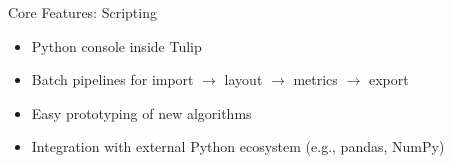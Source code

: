 \begin{frame}{Core Features: Scripting}
	\begin{itemize}
		\item Python console inside Tulip
		\item Batch pipelines for import $\rightarrow$ layout $\rightarrow$ metrics $\rightarrow$ export
		\item Easy prototyping of new algorithms
		\item Integration with external Python ecosystem (e.g., pandas, NumPy)
	\end{itemize}
\end{frame}
